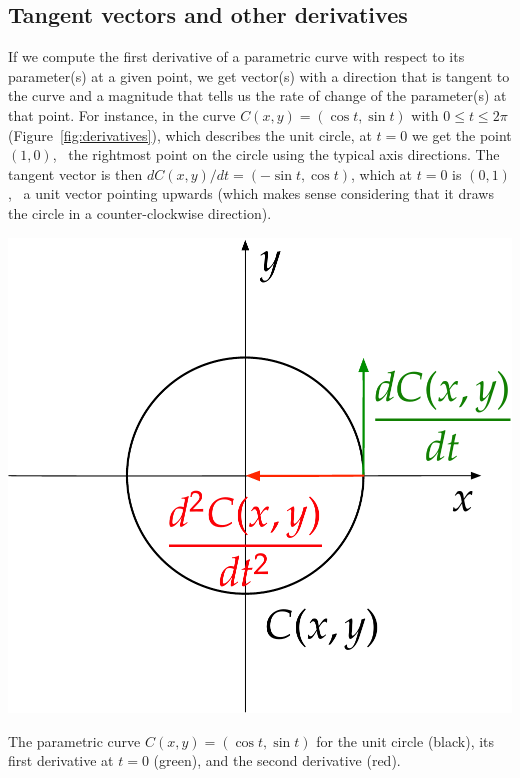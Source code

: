 \subsection{Tangent vectors and other derivatives}

If we compute the first derivative of a parametric curve with respect to its parameter(s) at a given point, we get vector(s) with a direction that is tangent to the curve and a magnitude that tells us the rate of change of the parameter(s) at that point.
For instance, in the curve \(C(x,y) = (\cos t, \sin t)\) with \(0 \leq t \leq 2\pi \) (Figure~\ref{fig:derivatives}), which describes the unit circle, at \(t=0\) we get the point \((1, 0)\), \ie\ the rightmost point on the circle using the typical axis directions.
The tangent vector is then \(dC(x,y)/dt = (-\sin t, \cos t)\), which at \(t=0\) is \((0, 1)\), \ie\ a unit vector pointing upwards (which makes sense considering that it draws the circle in a counter-clockwise direction).

\begin{marginfigure}
\centering
\includegraphics[width=\linewidth]{figs/derivatives}
\caption{The parametric curve \(C(x,y) = (\cos t, \sin t)\) for the unit circle (black), its first derivative at \(t=0\) (green), and the second derivative (red).}%
\label{fig:derivatives}
\end{marginfigure}

